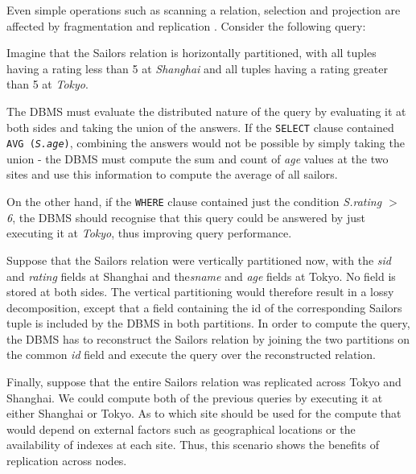 Even simple operations such as scanning a relation, selection and projection are affected by fragmentation and replication \cite{Ramakrishnan:2002:DMS:560733}. Consider the following query:




Imagine that the Sailors relation is horizontally partitioned, with all tuples having a rating less than 5 at \textit{Shanghai} and all tuples having a rating greater than 5 at \textit{Tokyo}.

The DBMS must evaluate the distributed nature of the query by evaluating it at both sides and taking the union of the answers. If the \texttt{SELECT} clause contained \texttt{AVG (\textit{S.age})}, combining the answers would not be possible by simply taking the union - the DBMS must compute the sum and count of \textit{age} values at the two sites and use this information to compute the average of all sailors. 

On the other hand, if the \texttt{WHERE} clause contained just the condition \textit{S.rating $>$ 6}, the DBMS should recognise that this query could be answered by just executing it at \textit{Tokyo}, thus improving query performance.

Suppose that the Sailors relation were vertically partitioned now, with the \textit{sid} and \textit{rating} fields at Shanghai and the\textit{sname} and \textit{age} fields at Tokyo. No field is stored at both sides. The vertical partitioning would therefore result in a lossy decomposition, except that a field containing the id of the corresponding Sailors tuple is included by the DBMS in both partitions. In order to compute the query, the DBMS has to reconstruct the Sailors relation by joining the two partitions on the common \textit{id} field and execute the query over the reconstructed relation.

Finally, suppose that the entire Sailors relation was replicated across Tokyo and Shanghai. We could compute both of the previous queries by executing it at either Shanghai or Tokyo. As to which site should be used for the compute that would depend on external factors such as geographical locations or the availability of indexes at each site. Thus, this scenario shows the benefits of replication across nodes.

